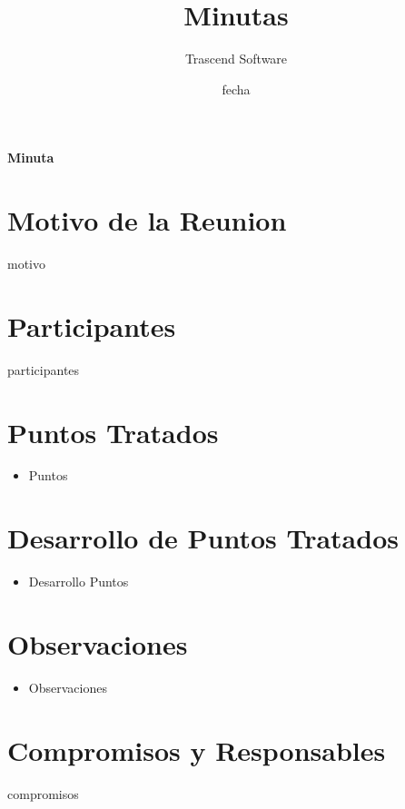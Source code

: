 \documentclass{article}
\title{Minutas}
\date{
fecha
}
\author{Trascend Software}
\begin{document}


\maketitle %
\newpage %
\begin{center}

	\huge{\bf  Minuta}

\end{center}
\section{\bf  Motivo de la Reunion}
motivo
\section{\bf  Participantes}
participantes

\section{\bf Puntos Tratados}
	\begin{itemize}
		\item Puntos
		\end{itemize}

\section{\bf Desarrollo de Puntos Tratados}
	\begin{itemize}
		\item Desarrollo Puntos
		\end{itemize}

\section{\bf Observaciones}
	\begin{itemize}
		\item Observaciones

		\end{itemize}

\section{\bf Compromisos y Responsables}

compromisos
\end{document}
